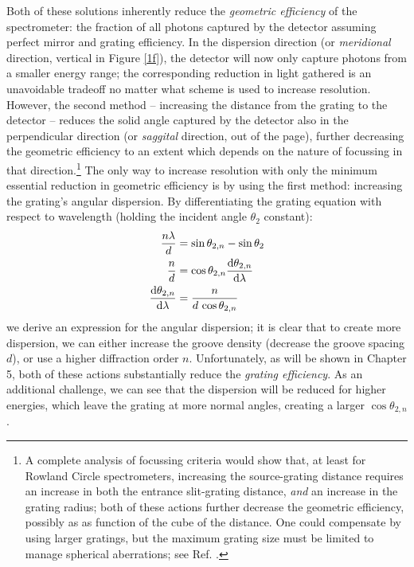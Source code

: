 Both of these solutions inherently reduce the \emph{geometric efficiency} of the spectrometer: the fraction of all photons captured by the detector assuming perfect mirror and grating efficiency.  In the dispersion direction (or \emph{meridional} direction, vertical in Figure \ref{1f}), the detector will now only capture photons from a smaller energy range; the corresponding reduction in light gathered is an unavoidable tradeoff no matter what scheme is used to increase  resolution.  However, the second method -- increasing the distance from the grating to the detector --  reduces the solid angle captured by the detector also in the perpendicular direction (or \emph{saggital} direction, out of the page), further decreasing the geometric efficiency to an extent which depends on the nature of focussing in that direction.\footnote{A complete analysis of focussing criteria would show that, at least for Rowland Circle spectrometers, increasing the source-grating distance requires an increase in both the entrance slit-grating distance, \emph{and} an increase in the grating radius; both of these actions further decrease the geometric efficiency, possibly as as function of the cube of the distance.  One could compensate by using larger gratings, but the maximum grating size must be limited to manage spherical aberrations; see Ref. \cite[p.~98]{Mui06}.}  The only way to increase resolution with only the minimum essential reduction in geometric efficiency is by using the first method: increasing the grating's angular dispersion.  By differentiating the grating equation  with respect to wavelength (holding the incident angle $\theta_{2}$ constant):
\begin{align}
\frac{n\lambda}{d} &= \sin\theta_{2,n} - \sin\theta_{2} \\
\frac{n}{d} &= \cos \theta_{2,n} \frac{\mathrm{d} \theta_{2,n}}{\mathrm{d} \lambda} \\
\frac{\mathrm{d} \theta_{2,n}}{\mathrm{d} \lambda} &= \frac{n}{d\, \cos \theta_{2,n}}
\label{angularDispersionEqn}
\end{align}
we derive an expression for the angular dispersion; it is clear that to create more dispersion, we can either increase the groove density (decrease the groove spacing $d$), or use a higher diffraction order $n$.  Unfortunately, as will be shown in Chapter 5, both of these actions substantially reduce the \emph{grating efficiency}.  As an additional challenge, we can see that the dispersion will be reduced for higher energies, which leave the grating at more normal angles, creating a larger $\cos \theta_{2,n}$.

